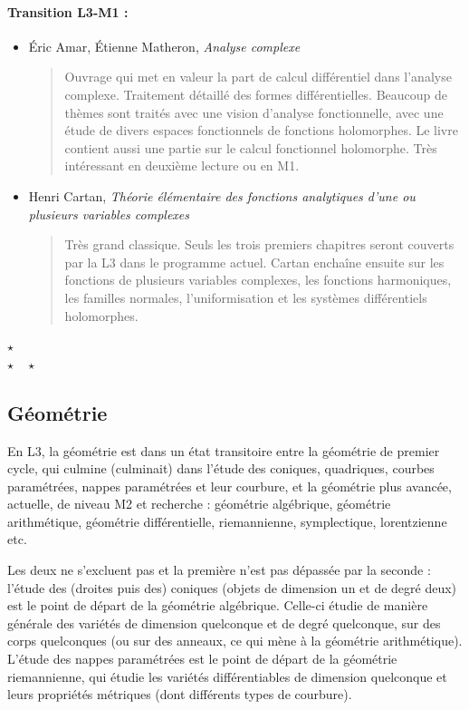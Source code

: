 \documentclass{article}
\def\separateur{\begin{center}
$\star$\\
$\star\quad\star$
\end{center}}
\begin{document}
\paragraph{Transition L3-M1 :}
\begin{itemize}
\item Éric Amar, Étienne Matheron, \emph{Analyse complexe}
\begin{quote}
Ouvrage qui met en valeur la part de calcul différentiel dans l'analyse complexe. Traitement détaillé des formes différentielles. Beaucoup de thèmes sont traités avec une vision d'analyse fonctionnelle, avec une étude de divers espaces fonctionnels de fonctions holomorphes. Le livre contient aussi une partie sur le calcul fonctionnel holomorphe. Très intéressant en deuxième lecture ou en M1.
\end{quote}
\item Henri Cartan, \emph{Théorie élémentaire des fonctions analytiques d'une ou plusieurs variables complexes}
\begin{quote}
Très grand classique. Seuls les trois premiers chapitres seront couverts par la L3 dans le programme actuel. Cartan enchaîne ensuite sur les fonctions de plusieurs variables complexes, les fonctions harmoniques, les familles normales, l'uniformisation et les systèmes différentiels holomorphes.
\end{quote}
\end{itemize}

\separateur
\subsection{Géométrie}

En L3, la géométrie est dans un état transitoire entre la géométrie de premier cycle, qui culmine (culminait) dans l'étude des coniques, quadriques, courbes paramétrées, nappes paramétrées et leur courbure, et la géométrie plus avancée, actuelle, de niveau M2 et recherche : géométrie algébrique, géométrie arithmétique, géométrie différentielle, riemannienne, symplectique, lorentzienne etc.

Les deux ne s'excluent pas et la première n'est pas \og dépassée\fg{} par la seconde : l'étude des (droites puis des) coniques (objets de dimension un et de degré deux) est le point de départ de la géométrie algébrique. Celle-ci étudie de manière générale des variétés de dimension quelconque et de degré quelconque, sur des corps quelconques (ou sur des anneaux, ce qui mène à la géométrie arithmétique). L'étude des nappes paramétrées est le point de départ de la géométrie riemannienne, qui étudie les variétés différentiables de dimension quelconque et leurs propriétés métriques (dont différents types de courbure).
\end{document}

